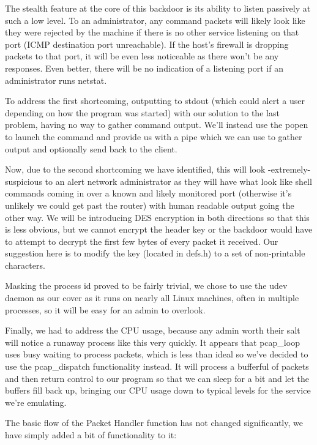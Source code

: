 \documentclass[titlepage]{article}
\begin{document}
The stealth feature at the core of this backdoor is its ability to
listen passively at such a low level. To an administrator, any command
packets will likely look like they were rejected by the machine if
there is no other service listening on that port (ICMP destination port
unreachable). If the host's firewall is dropping packets to that port,
it will be even less noticeable as there won't be any responses.
Even better, there will be no indication of a listening port if an
administrator runs netstat.

To address the first shortcoming, outputting to stdout (which could
alert a user depending on how the program was started) with our solution
to the last problem, having no way to gather command output. We'll
instead use the popen to launch the command and provide us with a pipe
which we can use to gather output and optionally send back to the 
client.

Now, due to the second shortcoming we have identified, this will look
-extremely- suspicious to an alert network administrator as they will
have what look like shell commands coming in over a known and likely
monitored port (otherwise it's unlikely we could get past the router)
with human readable output going the other way. We will be introducing
DES encryption in both directions so that this is less obvious, but we
cannot encrypt the header key or the backdoor would have to attempt to
decrypt the first few bytes of every packet it received. Our suggestion
here is to modify the key (located in defs.h) to a set of non-printable
characters.

Masking the process id proved to be fairly trivial, we chose to use
the udev daemon as our cover as it runs on nearly all Linux machines,
often in multiple processes, so it will be easy for an admin to
overlook.

Finally, we had to address the CPU usage, because any admin worth their
salt will notice a runaway process like this very quickly. It appears
that pcap\_loop uses busy waiting to process packets, which is less
than ideal so we've decided to use the pcap\_dispatch functionality
instead. It will process a bufferful of packets and then return control
to our program so that we can sleep for a bit and let the buffers fill
back up, bringing our CPU usage down to typical levels for the service
we're emulating.

The basic flow of the Packet Handler function has not changed 
significantly, we have simply added a bit of functionality to it:
\end{document}
